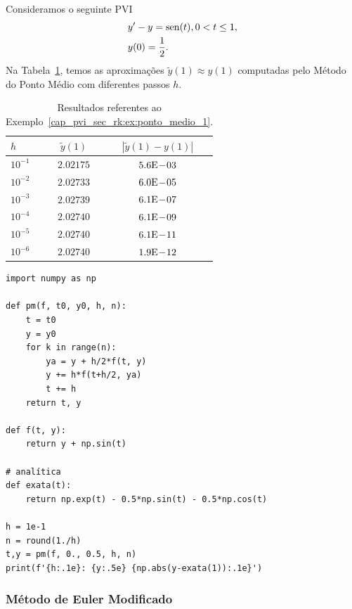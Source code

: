 \begin{ex}\label{cap_pvi_sec_rk:ex:ponto_medio_1}
  Consideramos o seguinte PVI
  \begin{subequations}
    \begin{align}
      &y' - y = \operatorname{sen}(t), 0< t \leq 1,\\
      &y(0) = \frac{1}{2}.
    \end{align}
\end{subequations}
  Na Tabela~\ref{cap_pvi_sec_rk:tab:ex_ponto_medio_1}, temos as aproximações $\tilde{y}(1) \approx y(1)$ computadas pelo Método do Ponto Médio com diferentes passos $h$.
 
  \begin{table}[H]
    \centering
    \begin{tabular}{l|cc}
      $h$ & $\tilde{y}(1)$ & $|\tilde{y}(1)-y(1)|$\\\hline
      $10^{-1}$ & $2.02175$ & $5.6\mathrm{E}\!-\!03$ \\
      $10^{-2}$ & $2.02733$ & $6.0\mathrm{E}\!-\!05$ \\
      $10^{-3}$ & $2.02739$ & $6.1\mathrm{E}\!-\!07$ \\
      $10^{-4}$ & $2.02740$ & $6.1\mathrm{E}\!-\!09$ \\
      $10^{-5}$ & $2.02740$ & $6.1\mathrm{E}\!-\!11$ \\
      $10^{-6}$ & $2.02740$ & $1.9\mathrm{E}\!-\!12$ \\\hline
    \end{tabular}
    \caption{Resultados referentes ao Exemplo~\ref{cap_pvi_sec_rk:ex:ponto_medio_1}.}
    \label{cap_pvi_sec_rk:tab:ex_ponto_medio_1}
  \end{table}

\begin{lstlisting}[caption=pm.py, label=cap_pvi_sec_rk:cod:pm]
import numpy as np

def pm(f, t0, y0, h, n):
    t = t0
    y = y0
    for k in range(n):
        ya = y + h/2*f(t, y)
        y += h*f(t+h/2, ya)
        t += h
    return t, y

def f(t, y):
    return y + np.sin(t)

# analítica
def exata(t):
    return np.exp(t) - 0.5*np.sin(t) - 0.5*np.cos(t)

h = 1e-1
n = round(1./h)
t,y = pm(f, 0., 0.5, h, n)
print(f'{h:.1e}: {y:.5e} {np.abs(y-exata(1)):.1e}')
\end{lstlisting}
\end{ex}

\subsubsection{Método de Euler Modificado}

